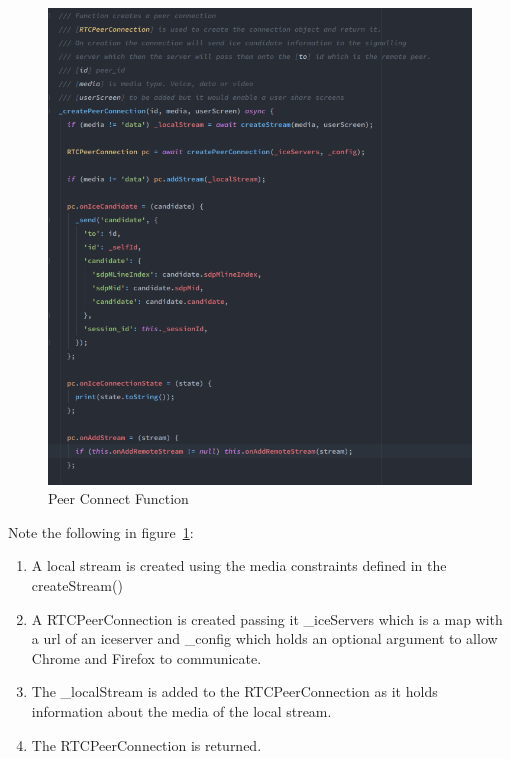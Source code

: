 \begin{figure}[h!]
    \caption{Peer Connect Function}
    \label{image:peerConnectFunction}
    \centering
    \includegraphics[width=1.0\textwidth]{images/connect_peer_function.png}
\end{figure}
Note the following in figure~\ref{image:peerConnectFunction}:
\begin{enumerate}
    \item A local stream is created using the media constraints defined in the createStream()
    \item A RTCPeerConnection is created passing it \_iceServers which is a map with a url of an iceserver and \_config which holds an optional argument to allow Chrome and Firefox to communicate.
    \item The \_localStream is added to the RTCPeerConnection as it holds information about the media of the local stream.
    \item The RTCPeerConnection is returned.
\end{enumerate}

